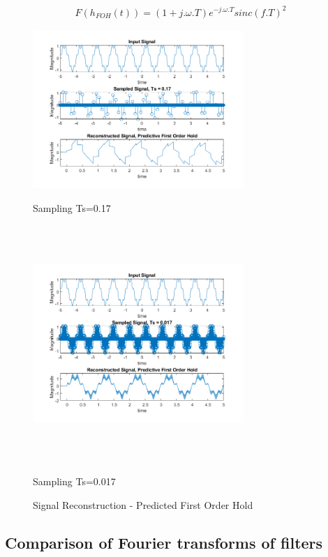 \documentclass{article}
\begin{document}
\begin{equation}
\begin{aligned}
    F(h_{FOH}(t)) = (1 + j.\omega.T) e^{-j.\omega.T} sinc(f.T)^2
\end{aligned}
\end{equation}

\begin{figure}[!htb]
      \includegraphics[width=8cm]{figures/Predictive_0.17.png}
      \caption{Sampling Ts=0.17}
    \endminipage\hfill
      \includegraphics[width=8cm, height=9cm]{figures/Predictive_0.017.png}
      \caption{Sampling Ts=0.017}
    \endminipage\hfill
    \caption{Signal Reconstruction - Predicted First Order Hold}
\end{figure}

\subsection{Comparison of Fourier transforms of filters}
\end{document}
